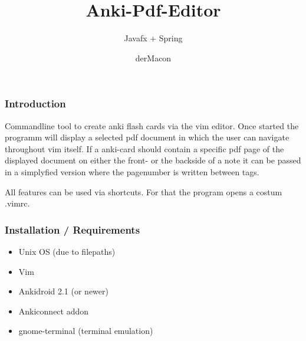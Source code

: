 \documentclass[xcolor=dvipanames]{beamer}
\title{Anki-Pdf-Editor}
\subtitle{Javafx + Spring}
\author{derMacon}
\makeatletter
\newcommand\listofframes{\@starttoc{lbf}}
\makeatother
\begin{document}
	\begin{frame}
		\titlepage
	\end{frame}
	
	\begin{frame}
		\listofframes
	\end{frame}
		
	\begin{frame}
		\frametitle{Introduction}
		Commandline tool to create anki flash cards via the vim editor. Once started the programm will display a selected pdf document in which the user can navigate throughout vim itself. If a anki-card should contain a specific pdf page of the displayed document on either the front- or the backside of a note it can be passed in a simplyfied version where the pagenumber is written between tags.

All features can be used via shortcuts. For that the program opens a costum .vimrc.
	\end{frame}
	
	\begin{frame}
		\frametitle{Installation / Requirements}
		\begin{itemize}
			\item Unix OS (due to filepaths)
			\item Vim
			\item Ankidroid 2.1 (or newer)
			\item Ankiconnect addon 
			\item gnome-terminal (terminal emulation)
		\end{itemize}
	\end{frame}
	
\end{document}
